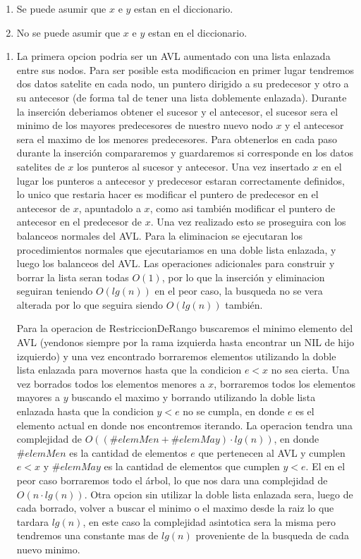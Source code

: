 \documentclass[10pt, a4paper]{article}
\begin{document}
\begin{enumerate}
 \item Se puede asumir que $x$ e $y$ estan en el diccionario. 
 \item No se puede asumir que $x$ e $y$ estan en el diccionario. 
\end{enumerate}

\begin{enumerate}
 \item La primera opcion podria ser un AVL aumentado con una lista enlazada entre sus nodos. Para ser posible esta modificacion en primer lugar tendremos dos datos satelite en cada nodo, un puntero dirigido a su predecesor y otro a su antecesor (de forma tal de tener una lista doblemente enlazada). Durante la inserci\'on deberiamos obtener el sucesor y el antecesor, el sucesor sera el minimo de los mayores predecesores de nuestro nuevo nodo $x$ y el antecesor sera el maximo de los menores predecesores. Para obtenerlos en cada paso durante la inserci\'on compararemos y guardaremos si corresponde en los datos satelites de $x$ los punteros al sucesor y antecesor. Una vez insertado $x$ en el lugar los punteros a antecesor y predecesor estaran correctamente definidos, lo unico que restaria hacer es modificar el puntero de predecesor en el antecesor de $x$, apuntadolo a $x$, como asi tambi\'en modificar el puntero de antecesor en el predecesor de $x$. Una vez realizado esto se proseguira con los balanceos normales 
del 
AVL. Para la eliminacion se ejecutaran los procedimientos normales que ejecutariamos en una doble lista enlazada, y luego los balanceos del AVL. Las operaciones adicionales para construir y borrar la lista seran todas $O(1)$, por lo que la inserci\'on y eliminacion seguiran teniendo $O(lg(n))$ en el peor caso, la busqueda no se vera alterada por lo que seguira siendo $O(lg(n))$ tambi\'en. 
 
 Para la operacion de RestriccionDeRango buscaremos el minimo elemento del AVL (yendonos siempre por la rama izquierda hasta encontrar un NIL de hijo izquierdo) y una vez encontrado borraremos elementos utilizando la doble lista enlazada para movernos hasta que la condicion $e < x$ no sea cierta. Una vez borrados todos los elementos menores a $x$, borraremos todos los elementos mayores a $y$ buscando el maximo y borrando utilizando la doble lista enlazada hasta que la condicion $y < e$ no se cumpla, en donde $e$ es el elemento actual en donde nos encontremos iterando. La operacion tendra una complejidad de $O((\#elemMen + \#elemMay) \cdot lg(n))$, en donde $\#elemMen$ es la cantidad de elementos $e$ que pertenecen al AVL y cumplen $e < x$ y $\#elemMay$ es la cantidad de elementos que cumplen $y < e$. El en el peor caso borraremos todo el \'arbol, lo que nos dara una complejidad de $O(n \cdot lg(n))$. Otra opcion sin utilizar la doble lista enlazada sera, luego de cada borrado, volver a buscar el minimo o el 
maximo desde la raiz lo que tardara $lg(n)$, en este caso la complejidad asintotica sera la misma pero tendremos una constante mas de $lg(n)$ proveniente de la busqueda de cada nuevo minimo.
 

\end{enumerate}
\end{document}
